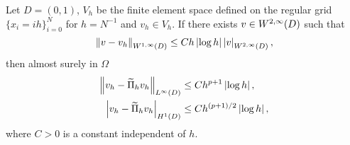 \documentclass[10pt]{article}
\begin{document}
\begin{lemma}\label{lem:Interp1D} Let $D = (0,1)$, $V_h$ be the finite element space defined on the regular grid $\{x_i = ih\}_{i=0}^{N}$ for $h = N^{-1}$ and $v_h \in V_h$. If there exists $v \in W^{2, \infty}(D)$ such that
	\begin{equation}\label{eq:RegularityInterp1D}
		\left\|v - v_h\right\|_{W^{1, \infty}(D)} \leq C h \left\lvert\log h\right\rvert \left\lvert v\right\rvert_{W^{2, \infty}(D)},
	\end{equation} 
	then almost surely in $\Omega$
	\begin{equation}
	\begin{aligned}
		\left\|v_h - \widetilde \Pi_h v_h\right\|_{L^\infty(D)} &\leq Ch^{p+1} \left\lvert\log h\right\rvert,\\
		\left\lvert v_h - \widetilde \Pi_h v_h\right\rvert_{H^1(D)} &\leq Ch^{(p+1)/2} \left\lvert\log h\right\rvert,
	\end{aligned}
	\end{equation}
	where $C > 0$ is a constant independent of $h$. 
\end{lemma}
\end{document}
